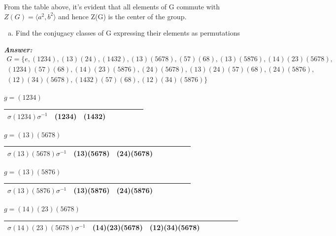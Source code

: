 \documentclass[11pt,a4paper]{article}
\begin{document}
\begin{enumerate}[1.]
\begin{flushleft}
			From the table above, it's evident that all elements of G commute with $Z(G) = \langle a^2, b^2 \rangle$ and hence Z(G) is the center of the group.          
		\end{flushleft}
		\begin{enumerate}[(d)]
			\item Find the conjugacy classes of G expressing their elements as permutations
		\end{enumerate}
		\begin{flushleft}
			\textbf{\textit{Answer:}} 
			\begin{multline*}
				G = \{e, (1234), (13)(24), (1432), (13)(5678), (57)(68), (13)(5876), (14)(23)(5678), \\
				(1234)(57)(68), (14)(23)(5876), (24)(5678), (13)(24)(57)(68), (24)(5876), \\
				(12)(34)(5678), (1432)(57)(68), (12)(34)(5876)\}
			\end{multline*}
			
			$g = (1234)$
			\begin{table}[H]
				\begin{tabular}{|r|r|r|r|r|r|r|r|}
					\hline
					$\sigma(1234)\sigma^{-1}$ & (1234) & (1432) \\
					\hline
				\end{tabular}
			\end{table}
			
			$g = (13)(5678)$
			\begin{table}[H]
				\begin{tabular}{|r|r|r|r|r|r|r|r|}
					\hline
					$\sigma(13)(5678)\sigma^{-1}$ & (13)(5678) & (24)(5678) \\
					\hline
				\end{tabular}
			\end{table}
			
			$g = (13)(5876)$
			\begin{table}[H]
				\begin{tabular}{|r|r|r|r|r|r|r|r|}
					\hline
					$\sigma(13)(5876)\sigma^{-1}$ & (13)(5876) & (24)(5876) \\
					\hline
				\end{tabular}
			\end{table}
			
			$g = (14)(23)(5678)$
			\begin{table}[H]
				\begin{tabular}{|r|r|r|r|r|r|r|r|}
					\hline
					$\sigma(14)(23)(5678)\sigma^{-1}$ & (14)(23)(5678) & (12)(34)(5678) \\
					\hline
				\end{tabular}
			\end{table}
			

\end{flushleft}
\end{enumerate}
\end{document}
